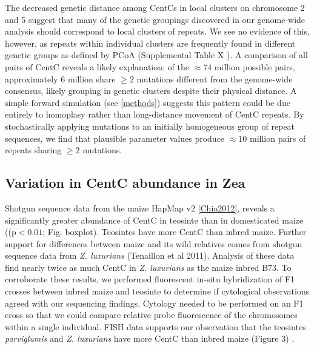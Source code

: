 The decreased genetic distance among CentCs in local clusters on chromosome 2 and 5 suggest that many of the genetic groupings discovered in our genome-wide analysis should correspond to local clusters of repeats. We see no evidence of this, however, as repeats within individual clusters are frequently found in different genetic groups as defined by PCoA (Supplemental Table X ).  A comparison of all pairs of CentC reveals a likely explanation: of the $\approx 74$ million possible pairs,  approximately 6 million  share $\geq 2$ mutations different from the genome-wide consensus, likely grouping in genetic clusters despite their physical distance.   A simple forward simulation (see \ref{methods}) suggests this pattern could be due entirely to homoplasy rather than long-distance movement of CentC repeats.  By stochastically applying mutations to an initially homogeneous group of repeat sequences, we find that plausible parameter values produce $\approx 10$ million pairs of repeats sharing $\geq 2$ mutations.      

\subsection*{Variation in CentC abundance in Zea}

Shotgun sequence data from the maize HapMap v2 \ref{Chia2012}, reveals a significantly greater abundance of CentC in teosinte than in domesticated maize ((p$<0.01$; Fig. boxplot). Teosintes have more CentC than inbred maize.  Further support for differences between maize and its wild relatives comes from shotgun sequence data from \emph{Z. luxurians} (Tenaillon et al 2011).  Analysis of these data find nearly twice as much CentC in \emph{Z. luxurians} as the maize inbred B73.  To corroborate these results, we performed fluorescent in-situ hybridization of F1 crosses between inbred maize and teosinte to determine if cytological observations agreed with our sequencing findings.  Cytology needed to be performed on an F1 cross so that we could compare relative probe fluorescence of the chromosomes within a single individual.  FISH data supports our observation that the teosintes \emph{parviglumis} and \emph{Z. luxurians} have more CentC than inbred maize (Figure 3) .    


